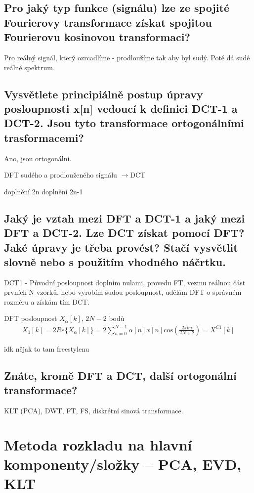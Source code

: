 \documentclass[a4paper,12pt]{article}   %
\newcommand{\rrarr}{$\rightarrow$}
\newcommand{\mt}[1]{$#1$}
\begin{document}
\subsection{Pro jaký typ funkce (signálu) lze ze spojité Fourierovy transformace získat spojitou Fourierovu kosinovou transformaci?}
Pro reálný signál, který ozrcadlíme - prodloužíme tak aby byl sudý. Poté dá sudé reálné spektrum.


\subsection{Vysvětlete principiálně postup úpravy posloupnosti x[n] vedoucí k definici DCT-1 a DCT-2. Jsou tyto transformace ortogonálními trasformacemi?}
Ano, jsou ortogonální. 

DFT sudého a prodlouženého signálu \rrarr DCT
\begin{outline}[enumerate]
        \1 doplnění 2n
        \1 doplnění 2n-1
\end{outline}


\subsection{Jaký je vztah mezi DFT a DCT-1 a jaký mezi DFT a DCT-2. Lze DCT získat pomocí DFT? Jaké úpravy je třeba provést? Stačí vysvětlit slovně nebo s použitím vhodného náčrtku.}

DCT1 - Původní posloupnost doplním nulami, provedu FT, vezmu reálnou část prvních N vzorků, nebo vyrobím sudou posloupnost, udělám DFT o správném rozměru a získám tím DCT.

DFT posloupnost \mt{X_\alpha[k]}, \mt{2N-2} bodů
\begin{align*}
        X_1[k] = 2Re\{X_\alpha[k]\} = 2\sum_{n=0}^{N-1}\alpha[n]x[n]\text{cos}\left(\frac{2\pi kn}{2N+2}\right) = X^{C1}[k]
\end{align*}

idk nějak to tam freestylenu


\subsection{Znáte, kromě DFT a DCT, další ortogonální transformace?}
KLT (PCA), DWT, FT, FS, diskrétní sinová transformace.


\newpage \section{Metoda rozkladu na hlavní komponenty/složky – PCA, EVD, KLT}
\end{document}
